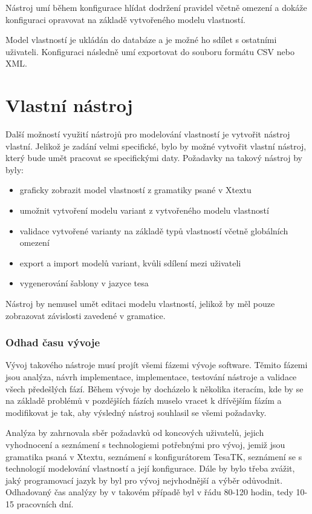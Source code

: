 Nástroj umí během konfigurace hlídat dodržení pravidel včetně omezení a dokáže konfiguraci opravovat na základě vytvořeného modelu vlastností.

Model vlastností je ukládán do databáze a je možné ho sdílet s ostatními uživateli. Konfiguraci následně umí exportovat do souboru formátu CSV nebo XML.

\section{Vlastní nástroj}

Další možností využití nástrojů pro modelování vlastností je vytvořit nástroj vlastní. Jelikož je zadání velmi specifické, bylo by možné vytvořit vlastní nástroj, který bude umět pracovat se specifickými daty. Požadavky na takový nástroj by byly:
\begin{itemize}
	\item graficky zobrazit model vlastností z gramatiky psané v Xtextu
	\item umožnit vytvoření modelu variant z vytvořeného modelu vlastností
	\item validace vytvořené varianty na základě typů vlastností včetně globálních omezení
	\item export a import modelů variant, kvůli sdílení mezi uživateli
	\item vygenerování šablony v jazyce tesa
\end{itemize}
Nástroj by nemusel umět editaci modelu vlastností, jelikož by měl pouze zobrazovat závislosti zavedené v gramatice.

\subsubsection{Odhad času vývoje}
Vývoj takového nástroje musí projít všemi fázemi vývoje software. Těmito fázemi jsou analýza, návrh implementace, implementace, testování nástroje a validace všech předešlých fází. Během vývoje by docházelo k několika iteracím, kde by se na základě problémů v pozdějších fázích muselo vracet k dřívějším fázím a modifikovat je tak, aby výsledný nástroj souhlasil se všemi požadavky.

Analýza by zahrnovala sběr požadavků od koncových uživatelů, jejich vyhodnocení a seznámení s technologiemi potřebnými pro vývoj, jemiž jsou gramatika psaná v Xtextu, seznámení s konfigurátorem TesaTK, seznámení se s technologií modelování vlastností a její konfigurace. Dále by bylo třeba zvážit, jaký programovací jazyk by byl pro vývoj nejvhodnější a výběr odůvodnit. Odhadovaný čas analýzy by v takovém případě byl v řádu 80-120 hodin, tedy 10-15 pracovních dní. 

